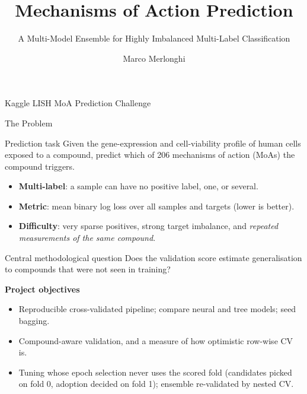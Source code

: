 \documentclass[aspectratio=169,10pt]{beamer}
\title[MoA Prediction]{Mechanisms of Action Prediction}
\subtitle{A Multi-Model Ensemble for Highly Imbalanced Multi-Label Classification}
\author{Marco Merlonghi}
\institute{Project Work in Machine Learning and Data Mining}
\date{}
\begin{document}
\begin{frame}
  \titlepage
  \vspace{-0.5em}
  \begin{center}
    \small Kaggle LISH MoA Prediction Challenge~\cite{moa}
  \end{center}
\end{frame}

\begin{frame}{The Problem}
\begin{block}{Prediction task}
Given the gene-expression and cell-viability profile of human cells exposed to a compound, predict which of 206 mechanisms of action (MoAs) the compound triggers.
\end{block}
\begin{itemize}
  \item \textbf{Multi-label}: a sample can have no positive label, one, or several.
  \item \textbf{Metric}: mean binary log loss over all samples and targets (lower is better).
  \item \textbf{Difficulty}: very sparse positives, strong target imbalance, and \emph{repeated measurements of the same compound}.
\end{itemize}
\begin{alertblock}{Central methodological question}
Does the validation score estimate generalisation to compounds that were not seen in training?
\end{alertblock}
\vspace{0.2em}
\textbf{Project objectives}
\begin{itemize}
  \item Reproducible cross-validated pipeline; compare neural and tree models; seed bagging.
  \item Compound-aware validation, and a measure of how optimistic row-wise CV is.
  \item Tuning whose epoch selection never uses the scored fold (candidates picked on fold 0, adoption decided on fold 1); ensemble re-validated by nested CV.
\end{itemize}
\end{frame}
\end{document}

